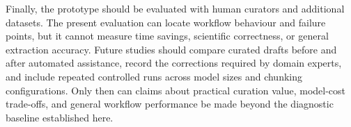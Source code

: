 Finally, the prototype should be evaluated with human curators and additional datasets.
The present evaluation can locate workflow behaviour and failure points, but it cannot measure time savings, scientific correctness, or general extraction accuracy.
Future studies should compare curated drafts before and after automated assistance, record the corrections required by domain experts, and include repeated controlled runs across model sizes and chunking configurations.
Only then can claims about practical curation value, model-cost trade-offs, and general workflow performance be made beyond the diagnostic baseline established here.
